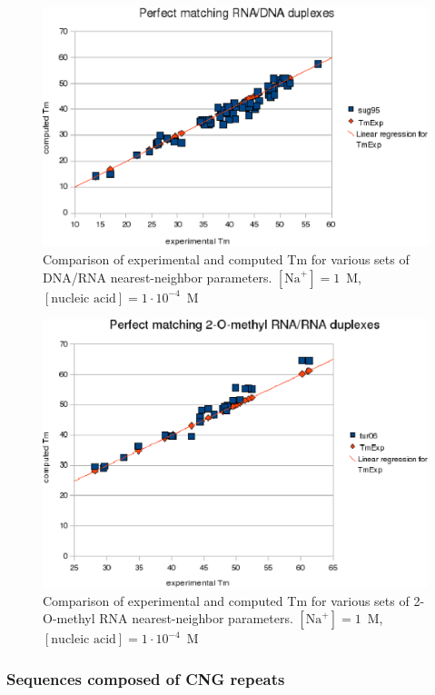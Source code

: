 \documentclass{article}
\begin{document}
\begin{figure}[h]
\includegraphics{images/DNARNA.eps}
\caption{Comparison of experimental and computed Tm for various sets of
  DNA/RNA nearest-neighbor parameters. $[\mbox{Na}^+] = 1$~M, $[\mbox{nucleic acid}] = 1\cdot{}10^{-4}$~M}
\end{figure} 

\begin{figure}[h]
\includegraphics{images/mRNARNA.eps}
\caption{Comparison of experimental and computed Tm for various sets of
  2-O-methyl RNA nearest-neighbor parameters. $[\mbox{Na}^+] = 1$~M, $[\mbox{nucleic acid}] = 1\cdot{}10^{-4}$~M}
\end{figure}
      
\subsubsection{Sequences composed of CNG repeats}
\end{document}
